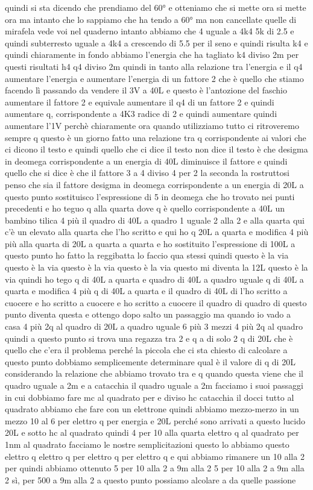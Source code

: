 \begin{soluzione}
{   quindi si sta dicendo che prendiamo del 60° e otteniamo che si mette ora si mette ora ma intanto che lo sappiamo che ha tendo a 60° ma non cancellate quelle di mirafela vede voi nel quaderno intanto abbiamo che 4 uguale a 4k4 5k di 2.5 e quindi subterresto uguale a 4k4 a crescendo di 5.5 per il seno e quindi risulta k4 e quindi chiaramente in fondo abbiamo l'energia che ha tagliato k4 diviso 2m per questi risultati h4 q4 diviso 2m quindi in tanto alla relazione tra l'energia e il q4 aumentare l'energia e aumentare l'energia di un fattore 2 che è quello che stiamo facendo lì passando da vendere il 3V a 40L e questo è l'antozione del faschio aumentare il fattore 2 e equivale aumentare il q4 di un fattore 2 e quindi aumentare q, corrispondente a 4K3 radice di 2 e quindi aumentare quindi aumentare l'1V perchè chiaramente ora quando utilizziamo tutto ci ritroveremo sempre q questo è un giorno fatto una relazione tra q corrispondente ai valori che ci dicono il testo e quindi quello che ci dice il testo non dice il testo è che desigma in deomega corrispondente a un energia di 40L diminuisce il fattore e quindi quello che si dice è che il fattore 3 a 4 diviso 4 per 2 la seconda la rostruttosi penso che sia il fattore desigma in deomega corrispondente a un energia di 20L a questo punto sostituisco l'espressione di 5 in deomega che ho trovato nei punti precedenti e ho teguo q alla quarta dove q è quello corrispondente a 40L un bambino tilica 4 più il quadro di 40L a quadro 1 uguale 2 alla 2 e alla quarta qui c'è un elevato alla quarta che l'ho scritto e qui ho q 20L a quarta e modifica 4 più più alla quarta di 20L a quarta a quarta e ho sostituito l'espressione di 100L a questo punto ho fatto la reggibatta lo faccio qua stessi quindi questo è la via questo è la via questo è la via questo è la via questo mi diventa la 12L questo è la via quindi ho tego q di 40L a quarta e quadro di 40L a quadro uguale q di 40L a quarta e modifica 4 più q di 40L a quarta e il quadro di 40L di l'ho scritto a cuocere e ho scritto a cuocere e ho scritto a cuocere il quadro di quadro di questo punto diventa questa e ottengo dopo salto un passaggio ma quando io vado a casa 4 più 2q al quadro di 20L a quadro uguale 6 più 3 mezzi 4 più 2q al quadro quindi a questo punto si trova una regazza tra 2 e q a di solo 2 q di 20L che è quello che c'era il problema perché la piccola che ci sta chiesto di calcolare a questo punto dobbiamo semplicemente determinare qual è il valore di q di 20L considerando la relazione che abbiamo trovato tra e q quando questa viene che il quadro uguale a 2m e a catacchia il quadro uguale a 2m facciamo i suoi passaggi in cui dobbiamo fare mc al quadrato per e diviso hc catacchia il docci tutto al quadrato abbiamo che fare con un elettrone quindi abbiamo mezzo-merzo in un mezzo 10 al 6 per elettro q per energia e 20L perché sono arrivati a questo lucido 20L e sotto hc al quadrato quindi 4 per 10 alla quarta elettro q al quadrato per 1nm al quadrato facciamo le nostre semplicitazioni questo lo abbiamo questo elettro q elettro q per elettro q per elettro q e qui abbiamo rimanere un 10 alla 2 per quindi abbiamo ottenuto 5 per 10 alla 2 a 9m alla 2 5 per 10 alla 2 a 9m alla 2 sì, per 500 a 9m alla 2 a questo punto possiamo alcolare a da quelle passione 
   
}
\end{soluzione}
